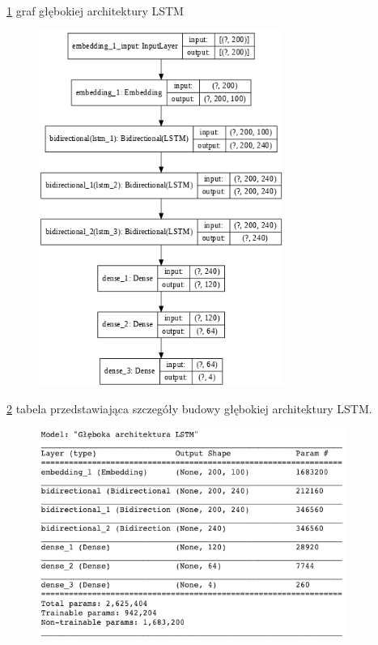\ref{rys:lstm_deep_graph} graf głębokiej architektury LSTM

\begin{figure}[t]
\centering\includegraphics[width=8cm]{figures/reports/lstm_deep_graph.png}
\label{rys:lstm_deep_graph}
\end{figure}

\ref{rys:lstm_deep_table} tabela przedstawiająca szczegóły budowy głębokiej architektury LSTM.

\begin{figure}[t]
\centering\includegraphics[width=10cm]{figures/reports/lstm_deep_table.png}
\label{rys:lstm_deep_table}
\end{figure}

